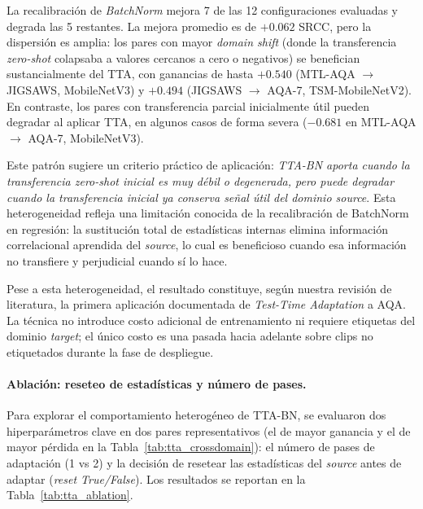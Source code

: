 La recalibración de \textit{BatchNorm} mejora 7 de las 12 configuraciones evaluadas y degrada las 5 restantes. La mejora promedio es de $+0.062$ \ac{SRCC}, pero la dispersión es amplia: los pares con mayor \textit{domain shift} (donde la transferencia \textit{zero-shot} colapsaba a valores cercanos a cero o negativos) se benefician sustancialmente del TTA, con ganancias de hasta $+0.540$ (MTL-AQA $\to$ JIGSAWS, MobileNetV3) y $+0.494$ (JIGSAWS $\to$ AQA-7, TSM-MobileNetV2). En contraste, los pares con transferencia parcial inicialmente útil pueden degradar al aplicar TTA, en algunos casos de forma severa ($-0.681$ en MTL-AQA $\to$ AQA-7, MobileNetV3).

Este patrón sugiere un criterio práctico de aplicación: \textit{TTA-BN aporta cuando la transferencia zero-shot inicial es muy débil o degenerada, pero puede degradar cuando la transferencia inicial ya conserva señal útil del dominio source}. Esta heterogeneidad refleja una limitación conocida de la recalibración de BatchNorm en regresión: la sustitución total de estadísticas internas elimina información correlacional aprendida del \textit{source}, lo cual es beneficioso cuando esa información no transfiere y perjudicial cuando sí lo hace.

Pese a esta heterogeneidad, el resultado constituye, según nuestra revisión de literatura, la primera aplicación documentada de \textit{Test-Time Adaptation} a \ac{AQA}. La técnica no introduce costo adicional de entrenamiento ni requiere etiquetas del dominio \textit{target}; el único costo es una pasada hacia adelante sobre clips no etiquetados durante la fase de despliegue.

\paragraph{Ablación: reseteo de estadísticas y número de pases.} Para explorar el comportamiento heterogéneo de TTA-BN, se evaluaron dos hiperparámetros clave en dos pares representativos (el de mayor ganancia y el de mayor pérdida en la Tabla~\ref{tab:tta_crossdomain}): el número de pases de adaptación (1 vs 2) y la decisión de resetear las estadísticas del \textit{source} antes de adaptar (\textit{reset True/False}). Los resultados se reportan en la Tabla~\ref{tab:tta_ablation}.

